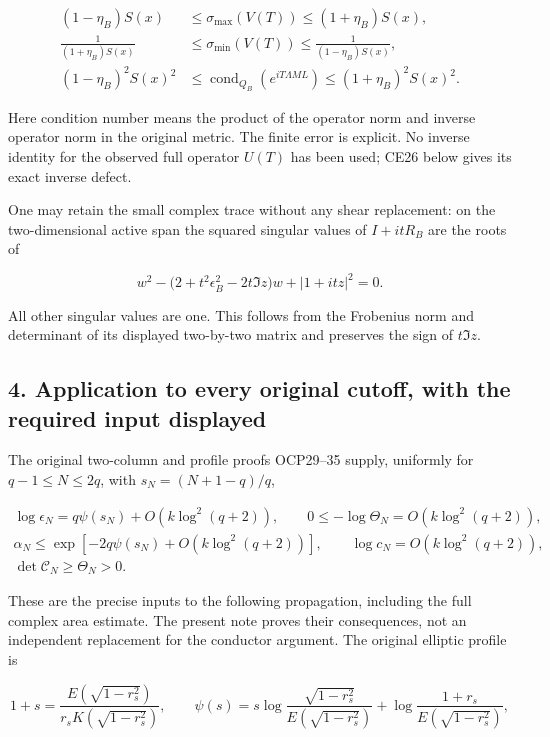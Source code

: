 \documentclass[10pt]{article}
\begin{document}
\[
\begin{aligned}
(1-\eta_B)S(x)&\le\sigma_{\max}(V(T))\le(1+\eta_B)S(x),\\
\frac1{(1+\eta_B)S(x)}&\le\sigma_{\min}(V(T))\le\frac1{(1-\eta_B)S(x)},\\
(1-\eta_B)^2S(x)^2&\le\operatorname{cond}_{Q_B}(e^{iT\Lambda ML})
\le(1+\eta_B)^2S(x)^2.
\end{aligned} \tag{CE19}
\]

Here condition number means the product of the operator norm and inverse operator norm in the original metric. The finite error is explicit. No inverse identity for the observed full operator \(U(T)\) has been used; CE26 below gives its exact inverse defect.

One may retain the small complex trace without any shear replacement: on the two-dimensional active span the squared singular values of \(I+itR_B\) are the roots of

\[
w^2-\bigl(2+t^2\epsilon_B^2-2t\Im z\bigr)w+|1+itz|^2=0.
\]

All other singular values are one. This follows from the Frobenius norm and determinant of its displayed two-by-two matrix and preserves the sign of \(t\Im z\).

\subsection{4. Application to every original cutoff, with the required input displayed}\label{application-to-every-original-cutoff-with-the-required-input-displayed}

The original two-column and profile proofs OCP29--35 supply, uniformly for \(q-1\le N\le2q\), with \(s_N=(N+1-q)/q\),

\[
\begin{gathered}
\log\epsilon_N=q\psi(s_N)+O(k\log^2(q+2)),\qquad
0\le-\log\Theta_N=O(k\log^2(q+2)),\\
\alpha_N\le\exp[-2q\psi(s_N)+O(k\log^2(q+2))],\qquad
\log c_N=O(k\log^2(q+2)),\\
\det\mathcal C_N\ge\Theta_N>0.
\end{gathered} \tag{CE20}
\]

These are the precise inputs to the following propagation, including the full complex area estimate. The present note proves their consequences, not an independent replacement for the conductor argument. The original elliptic profile is

\[
1+s=\frac{E(\sqrt{1-r_s^2})}{r_sK(\sqrt{1-r_s^2})},\qquad
\psi(s)=s\log\frac{\sqrt{1-r_s^2}}{E(\sqrt{1-r_s^2})}
+\log\frac{1+r_s}{E(\sqrt{1-r_s^2})},
\]
\end{document}

